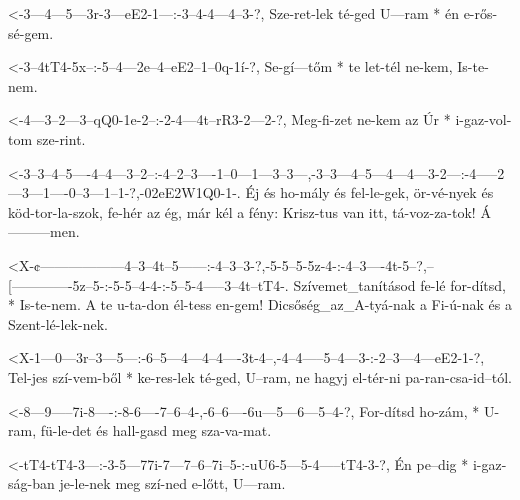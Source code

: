   {<-3---4---5---3r-3---eE2-1---:-3--4-4---4--3-?,}
  {  Sze-ret-lek té-ged U---ram * én e-rős-sé-gem.}

  {<-3--4tT4-5x--:-5--4---2e--4--eE2--1--0q-1í-?,}
  {  Se-gí---tőm * te let-tél ne-kem, Is-te-nem.}

  {<-4---3--2---3--qQ0-1e-2--:-2-4---4t--rR3-2---2-?,}
  {  Meg-fi-zet ne-kem az Úr * i-gaz-vol-tom sze-rint.}


  {<-3--3--4--5----4--4---3--2--:-4--2--3----1--0---1---3--3---,-3--3---4--5---4---4---3-2---:-4-----2---3---1----0--3---1--1-?,-02eE2W1Q0-1-.}
  {  Éj és ho-mály és fel-le-gek, ör-vé-nyek és köd-tor-la-szok, fe-hér az ég, már kél a fény: Krisz-tus van itt, tá-voz-za-tok! Á---------men.}

  {<X-¢------------------4--3--4t--5------:-4--3--3-?,-5-5--5-5z-4-:-4--3----4t-5--?,--[-------------5z--5-:-5-5--4-4-:-5--5-4-----3--4t--tT4-.}
  {   Szívemet_tanításod fe-lé for-dítsd, * Is-te-nem. A te u-ta-don él-tess en-gem!   Dicsőség_az_A-tyá-nak a Fi-ú-nak és a Szent-lé-lek-nek.}


  {<X-1---0---3r--3---5---:-6--5---4---4--4----3t-4--,-4--4-----5--4---3-:-2--3---4---eE2-1-?,}
  {   Tel-jes szí-vem-ből * ke-res-lek té-ged, U--ram, ne hagyj el-tér-ni  pa-ran-csa-id--tól.}

  {<-8---9-----7i-8----:-8-6----7--6--4-,-6--6----6u---5---6---5--4-?,}
  {  For-dítsd ho-zám, * U-ram, fü-le-det és hall-gasd meg sza-va-mat.}

  {<-tT4-tT4-3---:-3-5---77i-7---7--6--7i--5-:-uU6-5---5-4-----tT4-3-?,}
  {  Én  pe--dig * i-gaz-ság-ban je-le-nek meg szí-ned e-lőtt, U---ram.}


